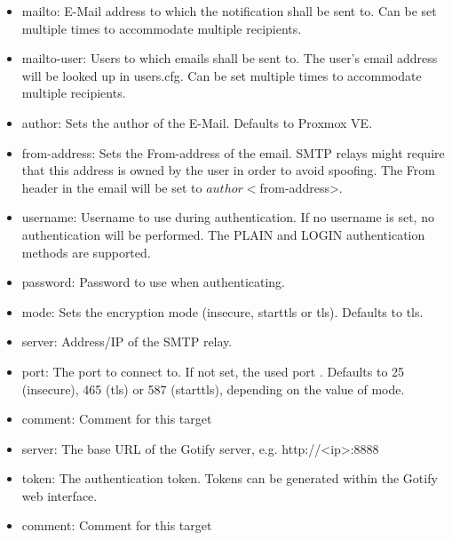 \begin{itemize}[leftmargin=2cm]

	\item mailto: E-Mail address to which the notification shall be sent to. Can be set multiple times to accommodate multiple recipients.

	\item mailto-user: Users to which emails shall be sent to. The user’s email address will be looked up in users.cfg. Can be set multiple times to accommodate multiple recipients.

	\item author: Sets the author of the E-Mail. Defaults to Proxmox VE.

	\item from-address: Sets the From-address of the email. SMTP relays might require that this address is owned by the user in order to avoid spoofing. The From header in the email will be set to $author <$from-address>.

	\item username: Username to use during authentication. If no username is set, no authentication will be performed. The PLAIN and LOGIN authentication methods are supported.

	\item password: Password to use when authenticating.

	\item mode: Sets the encryption mode (insecure, starttls or tls). Defaults to tls.

	\item server: Address/IP of the SMTP relay.

	\item port: The port to connect to. If not set, the used port . Defaults to 25 (insecure), 465 (tls) or 587 (starttls), depending on the value of mode.

	\item comment: Comment for this target

\end{itemize}

\begin{itemize}[leftmargin=2cm]

	\item server: The base URL of the Gotify server, e.g. http://<ip>:8888

	\item token: The authentication token. Tokens can be generated within the Gotify web interface.

	\item comment: Comment for this target

\end{itemize}

